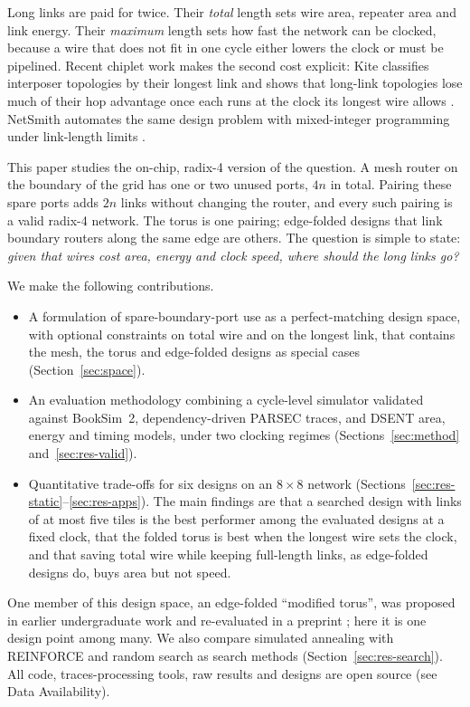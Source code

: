 \documentclass[preprint,12pt,a4paper]{elsarticle}
\begin{document}
Long links are paid for twice. Their \emph{total} length sets wire area,
repeater area and link energy. Their \emph{maximum} length sets how fast
the network can be clocked, because a wire that does not fit in one cycle
either lowers the clock or must be pipelined. Recent chiplet work makes
the second cost explicit: Kite classifies interposer topologies by their
longest link and shows that long-link topologies lose much of their hop
advantage once each runs at the clock its longest wire allows
\cite{kite}. NetSmith automates the same design problem with mixed-integer
programming under link-length limits \cite{netsmith}.

This paper studies the on-chip, radix-4 version of the question. A mesh
router on the boundary of the grid has one or two unused ports, $4n$ in
total. Pairing these spare ports adds $2n$ links without changing the
router, and every such pairing is a valid radix-4 network. The torus is one
pairing; edge-folded designs that link boundary routers along the same
edge are others. The question is simple to state: \emph{given that wires cost area, energy and
clock speed, where should the long links go?}

We make the following contributions.
\begin{itemize}
  \item A formulation of spare-boundary-port use as a perfect-matching
        design space, with optional constraints on total wire and on the
        longest link, that contains the mesh, the torus and edge-folded
        designs as special cases (Section~\ref{sec:space}).
  \item An evaluation methodology combining a cycle-level simulator
        validated against BookSim~2, dependency-driven PARSEC traces, and
        DSENT area, energy and timing models, under two clocking regimes
        (Sections~\ref{sec:method} and~\ref{sec:res-valid}).
  \item Quantitative trade-offs for six designs on an $8\times8$ network
        (Sections~\ref{sec:res-static}--\ref{sec:res-apps}). The main
        findings are that a searched design with links of at most five
        tiles is the best performer among the evaluated designs at a fixed
        clock, that the folded torus is best when the longest wire sets the
        clock, and that saving total wire while keeping full-length links, as
        edge-folded designs do, buys area but not speed.
\end{itemize}
One member of this design space, an edge-folded ``modified torus'', was
proposed in earlier undergraduate work \cite{thesis2023} and re-evaluated
in a preprint \cite{ray2026preprint}; here it is one design point among
many. We also compare simulated annealing with REINFORCE and random search
as search methods (Section~\ref{sec:res-search}).
All code, traces-processing tools, raw results and designs are open source
(see Data Availability).
\end{document}
